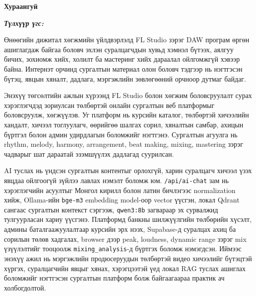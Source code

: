 

\begin{center}
{\scshape\Large \univname\par} %
{\scshape\large \facname\par}\vspace{0.5cm} %
{\huge\textbf{{Хураангуй}} \par}
\bigskip
{\Large{\ttitle} \par} %
\bigskip

{\normalsize \shortname \par} %
\addressname
\end{center}

\textit{\textbf{Түлхүүр үгс: \keywordnames}}
\bigskip

Өнөөгийн дижитал хөгжмийн үйлдвэрлэлд FL Studio зэрэг DAW програм өргөн ашиглагдаж байгаа боловч эхлэн суралцагчдын хувьд хэмнэл бүтээх, аялгуу бичих, зохиомж хийх, холилт ба мастеринг хийх дараалал ойлгомжгүй хэвээр байна. Интернэт орчинд сургалтын материал олон боловч тэдгээр нь нэгтгэсэн бүтэц, явцын хяналт, дадлага, мэргэжлийн зөвлөгөөний орчноор дутмаг байдаг.

Энэхүү төгсөлтийн ажлын хүрээнд FL Studio болон хөгжим боловсруулалт сурах хэрэглэгчдэд зориулсан төлбөртэй онлайн сургалтын веб платформыг боловсруулж, хөгжүүлэв. Уг платформ нь курсийн каталог, төлбөртэй хичээлийн хандалт, хичээл тоглуулагч, өөрийгөө шалгах сорил, хяналтын самбар, ахицын бүртгэл болон админ удирдлагын боломжийг нэгтгэнэ. Сургалтын агуулга нь rhythm, melody, harmony, arrangement, beat making, mixing, mastering зэрэг чадварыг шат дараатай эзэмшүүлэх дадлагад суурилсан.

AI туслах нь үндсэн сургалтын контентыг орлохгүй, харин суралцагч хичээл үзэх явцдаа ойлгоогүй зүйлээ лавлах нэмэлт боломж юм. \texttt{/api/ai-chat} зам нь хэрэглэгчийн асуултыг Монгол кирилл болон латин бичлэгээс normalization хийж, Ollama-ийн \texttt{bge-m3} embedding model-оор vector үүсгэн, локал Qdrant сангаас сургалтын контекст сэргээж, \texttt{qwen3:8b} загвараар эх сурвалжид тулгуурласан хариу үүсгэнэ. Платформд банкны шилжүүлгийн төлбөрийн хүсэлт, админы баталгаажуулалтаар курсийн эрх нээх, Supabase-д суралцах ахиц ба сорилын төлөв хадгалах, browser дээр peak, loudness, dynamic range зэрэг mix үзүүлэлтийг тооцоолж \texttt{mixing\_analysis}-д бүртгэх боломж нэмэгдсэн. Иймээс энэхүү ажил нь мэргэжлийн продюсеруудын төлбөртэй видео хичээлийг бүтэцтэй хүргэх, суралцагчийн явцыг хянах, хэрэгцээтэй үед локал RAG туслах ашиглах боломжийг нэгтгэсэн сургалтын платформ болж байгаагаараа практик ач холбогдолтой.
